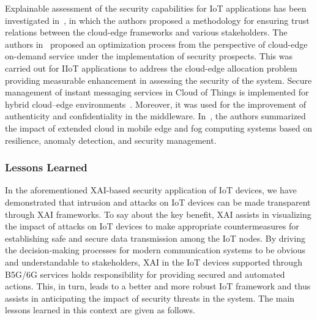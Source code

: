 \documentclass[journal]{IEEEtran}
\begin{document}
Explainable assessment of the security capabilities for IoT applications has been investigated in~\cite{forti2020secure}, in which the authors proposed a methodology for ensuring trust relations between the cloud-edge frameworks and various stakeholders. The authors in~\cite{casola2020security} proposed an optimization process from the perspective of cloud-edge on-demand service under the implementation of security prospects. This was carried out for IIoT applications to address the cloud-edge allocation problem providing measurable enhancement in assessing the security of the system. Secure management of instant messaging services in Cloud of Things is implemented for hybrid cloud–edge environments~\cite{celesti2019approach}. Moreover, it was used for the improvement of authenticity and confidentiality in the middleware. In~\cite{shirazi2017extended}, the authors summarized the impact of extended cloud in mobile edge and fog computing systems based on resilience, anomaly detection, and security management. 

\subsubsection{Lessons Learned} 
In the aforementioned XAI-based security application of IoT devices, we have demonstrated that intrusion and attacks on IoT devices can be made transparent through XAI frameworks. To say about the key benefit, XAI assists in visualizing the impact of attacks on IoT devices to make appropriate countermeasures for establishing safe and secure data transmission among the IoT nodes. By driving the decision-making processes for modern communication systems to be obvious and understandable to stakeholders, XAI in the IoT devices supported through B5G/6G services holds responsibility for providing secured and automated actions. This, in turn, leads to a better and more robust IoT framework and thus assists in anticipating the impact of security threats in the system. The main lessons learned in this context are given as follows.
\end{document}
